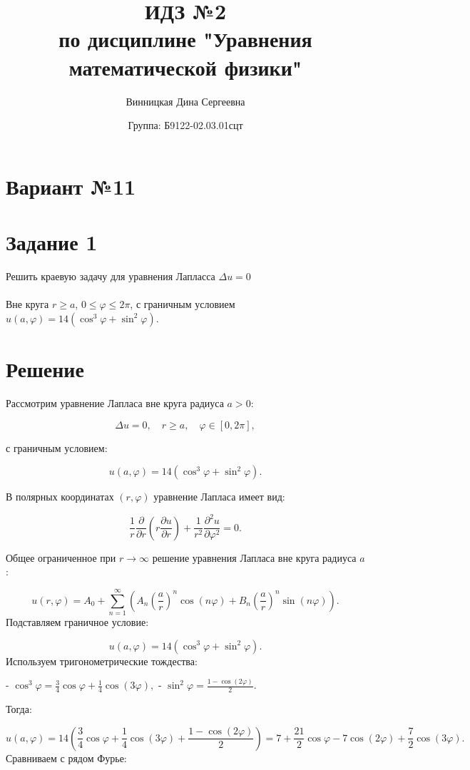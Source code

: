 \documentclass{article}
\title{\vspace{-1cm}ИДЗ №2 \\ по дисциплине "Уравнения математической физики"}
\author{Винницкая Дина Сергеевна}
\date{Группа: Б9122-02.03.01сцт}
\begin{document}
	
	\maketitle
\section*{Вариант №11}
\section*{Задание 1}

Решить краевую задачу для уравнения Лапласса $\Delta u = 0$ \\ \\
Вне круга $ r \geq a $, $ 0 \leq \varphi \leq 2\pi $, с граничным условием $ u(a, \varphi) = 14(\cos^3\varphi + \sin^2\varphi) $.
\section*{Решение}



Рассмотрим уравнение Лапласа вне круга радиуса $ a > 0 $:

$$
\Delta u = 0, \quad r \geq a, \quad \varphi \in [0, 2\pi],
$$

с граничным условием:

$$
u(a, \varphi) = 14(\cos^3\varphi + \sin^2\varphi).
$$


В полярных координатах $(r, \varphi)$ уравнение Лапласа имеет вид:

$$
\frac{1}{r} \frac{\partial}{\partial r}\left(r \frac{\partial u}{\partial r}\right) + \frac{1}{r^2} \frac{\partial^2 u}{\partial \varphi^2} = 0.
$$

Общее ограниченное при $r \to \infty$ решение уравнения Лапласа вне круга радиуса $a$:

$$
u(r, \varphi) = A_0 + \sum_{n=1}^\infty \left( A_n \left( \frac{a}{r} \right)^n \cos(n\varphi) + B_n \left( \frac{a}{r} \right)^n \sin(n\varphi) \right).
$$
Подставляем граничное условие:

$$
u(a, \varphi) = 14(\cos^3\varphi + \sin^2\varphi).
$$
Используем тригонометрические тождества:

- $\cos^3\varphi = \frac{3}{4} \cos\varphi + \frac{1}{4} \cos(3\varphi),$
- $\sin^2\varphi = \frac{1 - \cos(2\varphi)}{2}.$

Тогда:

$$
u(a, \varphi) = 14\left( \frac{3}{4} \cos\varphi + \frac{1}{4} \cos(3\varphi) + \frac{1 - \cos(2\varphi)}{2} \right)
= 7 + \frac{21}{2} \cos\varphi - 7 \cos(2\varphi) + \frac{7}{2} \cos(3\varphi).
$$
Сравниваем с рядом Фурье:
\end{document}
